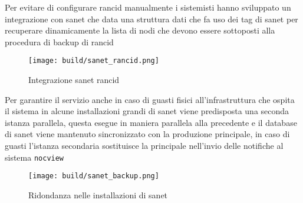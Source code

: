 Per evitare di configurare rancid manualmente i sistemisti hanno sviluppato un integrazione con sanet che data una struttura dati che fa uso dei tag di sanet per recuperare dinamicamente la lista di nodi che devono essere sottoposti alla procedura di backup di rancid

\begin{figure}[H]
    \centering
    \texttt{[image: build/sanet\_rancid.png]}
    \caption{Integrazione sanet rancid}
    \label{fig:enter-label}
\end{figure}

Per garantire il servizio anche in caso di guasti fisici all'infrastruttura che ospita il sistema in alcune installazioni grandi di sanet viene predisposta una seconda istanza parallela, questa esegue in maniera parallela alla precedente e il database di sanet viene mantenuto sincronizzato con la produzione principale, in caso di guasti l'istanza secondaria sostituisce la principale nell'invio delle notifiche al sistema \verb|nocview|

\begin{figure}[H]
    \centering
    \texttt{[image: build/sanet\_backup.png]}
    \caption{Ridondanza nelle installazioni di sanet}
    \label{fig:enter-label}
\end{figure}

%
%
%
%
%
